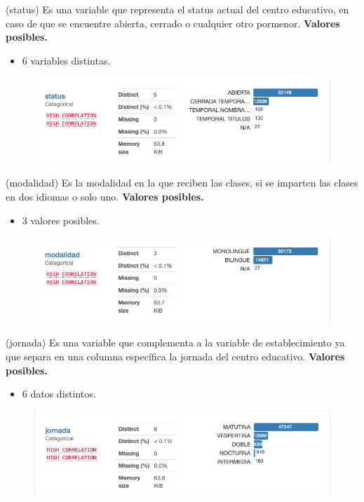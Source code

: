 \begin{variable}(status) 
Es una variable que representa el status actual del centro educativo, en caso de que se encuentre abierta, cerrado o cualquier otro pormenor.
\bigbreak 
\textbf{Valores posibles.}
\begin{itemize}
	\item 6 variables distintas.
\end{itemize}
\begin{figure}[H]
	\centering
	\includegraphics[scale=0.5]{Images/11}
\end{figure}
\end{variable}


\begin{variable}(modalidad) 
Es la modalidad en la que reciben las clases, si se imparten las clases en dos idiomas o solo uno. 
\bigbreak 
\textbf{Valores posibles.}
\begin{itemize}
	\item 3 valores posibles. 
\end{itemize}
\begin{figure}[H]
	\centering
	\includegraphics[scale=0.5]{Images/12}
\end{figure}
\end{variable}


\begin{variable}(jornada) 
Es una variable que complementa a la variable de establecimiento ya que separa en una columna específica la jornada del centro educativo.
\bigbreak 
\textbf{Valores posibles.}
\begin{itemize}
	\item 6 datos distintos. 
\end{itemize}
\begin{figure}[H]
	\centering
	\includegraphics[scale=0.5]{Images/13}
\end{figure}
\end{variable}


